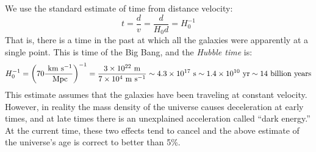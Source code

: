 \begin{enumerate}
  \begin{answer}
    We use the standard estimate of time from distance velocity:
    \begin{equation}
      t = \frac{d}{v} = \frac{d}{H_0 d} = H_0^{-1}
    \end{equation}
    That is, there is a time in the past at which all the galaxies
    were apparently at a single point. This is time of the Big Bang,
    and the {\it Hubble time} is:
    \begin{equation}
      H_0^{-1} = \left(70 \frac{{\rm ~km} {\rm ~s}^{-1}}{{\rm
          ~Mpc}}\right)^{-1} =  \frac{3 \times 10^{22} {\rm ~m}}{7
        \times 10^4 {\rm ~m} {\rm ~s}^{-1}} \sim 4.3 \times 10^{17}
      {\rm ~s} \sim 1.4 \times 10^{10} {\rm ~yr} \sim 14 {\rm
        ~billion~years}
    \end{equation}
    This estimate assumes that the galaxies have been traveling at
    constant velocity. However, in reality the mass density of the
    universe causes deceleration at early times, and at late times
    there is an unexplained acceleration called ``dark energy.'' At
    the current time, these two effects tend to cancel and the above
    estimate of the universe's age is correct to better than 5\%.
  \end{answer}
\end{enumerate}   


  
